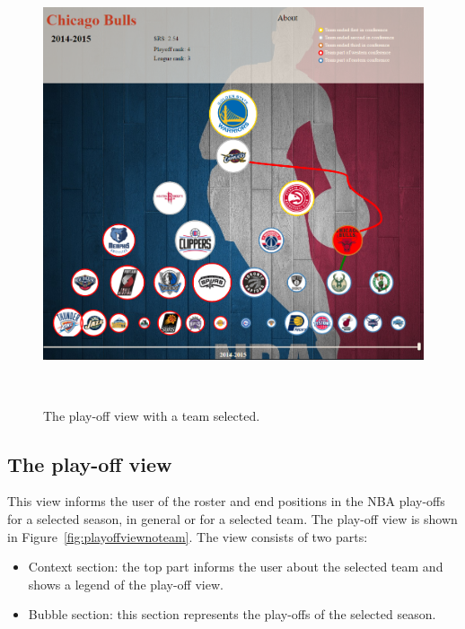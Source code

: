 \documentclass[]{sigchi}
\begin{document}
\begin{figure}
\centering
  \includegraphics[width=1.0\columnwidth]{figures/playoffviewteamselected}
  \caption{The play-off view with a team selected.}~\label{fig:playoffviewteam}
\end{figure}

\subsection{The play-off view}
This view informs the user of the roster and end positions in the NBA play-offs
for a selected season, in general or for a selected team. The play-off view is 
shown in Figure~\ref{fig:playoffviewnoteam}. The view consists of
two parts: 
\begin{itemize}
    \item Context section: the top part informs the user about the selected team
    and shows a legend of the play-off view.
    \item Bubble section: this section represents the play-offs of the selected
    season.
\end{itemize}
\end{document}
